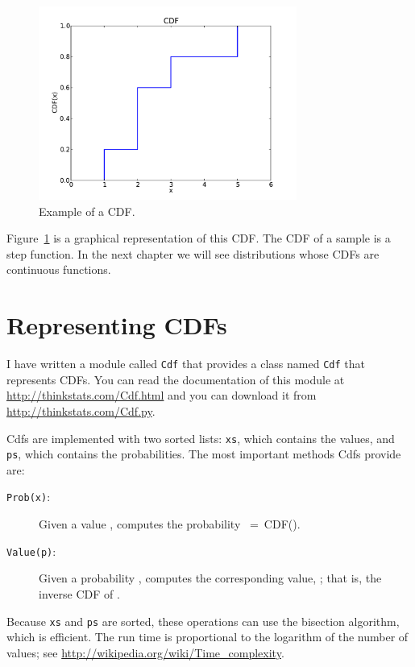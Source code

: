 \documentclass[12pt]{book}
\begin{document}
\begin{figure}
\centerline{\includegraphics[height=2.5in]{figs/example_cdf.pdf}}
\caption{Example of a CDF.}
\label{example_cdf}
\end{figure}

Figure~\ref{example_cdf} is a graphical representation of this CDF.
The CDF of a sample is a step function.  In the next chapter we
will see distributions whose CDFs are continuous functions.  


\section{Representing CDFs}

I have written a module called {\tt Cdf} that provides a class named
{\tt Cdf} that represents CDFs.  You can read the documentation of
this module at \url{http://thinkstats.com/Cdf.html} and you can download it
from \url{http://thinkstats.com/Cdf.py}.

Cdfs are implemented with two sorted lists: {\tt xs}, which contains
the values, and {\tt ps}, which contains the probabilities.  The
most important methods Cdfs provide are:

\begin{description}

\item[{\tt Prob(x)}:] Given a value \x, computes the probability \p~=~CDF(\x).

\item[{\tt Value(p)}:] Given a probability \p, computes the
corresponding value, \x; that is, the inverse CDF of \p.

\end{description}

Because {\tt xs} and {\tt ps} are sorted, these operations can use the
bisection algorithm, which is efficient.  The run time is proportional
to the logarithm of the number of values; see
\url{http://wikipedia.org/wiki/Time_complexity}.
\end{document}
